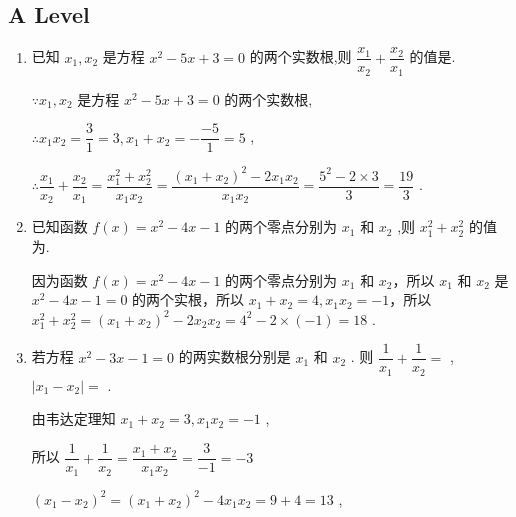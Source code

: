 \subsection*{A Level}
\begin{enumerate}
    \item 已知 ${x}_{1},{x}_{2}$ 是方程 ${x}^{2} - {5x} + 3 = 0$ 的两个实数根,则 $\dfrac{{x}_{1}}{{x}_{2}} + \dfrac{{x}_{2}}{{x}_{1}}$ 的值是.
    \begin{jieda}
        $\because {x}_{1},{x}_{2}$ 是方程 ${x}^{2} - {5x} + 3 = 0$ 的两个实数根,
        
        $\therefore {x}_{1}{x}_{2} = \dfrac{3}{1} = 3,{x}_{1} + {x}_{2} =  - \dfrac{-5}{1} = 5$ ,
        
        $\therefore \dfrac{{x}_{1}}{{x}_{2}} + \dfrac{{x}_{2}}{{x}_{1}} = \dfrac{{x}_{1}^{2} + {x}_{2}^{2}}{{x}_{1}{x}_{2}} = \dfrac{{\left( {x}_{1} + {x}_{2}\right) }^{2} - 2{x}_{1}{x}_{2}}{{x}_{1}{x}_{2}} = \dfrac{{5}^{2} - 2 \times  3}{3} = \dfrac{19}{3}$ .
        
    \end{jieda}
    
    \item 已知函数 $f\left( x\right)  = {x}^{2} - {4x} - 1$ 的两个零点分别为 ${x}_{1}$ 和 ${x}_{2}$ ,则 ${x}_{1}^{2} + {x}_{2}^{2}$ 的值为.
    \begin{jieda}
        因为函数 $f\left( x\right)  = {x}^{2} - {4x} - 1$ 的两个零点分别为 ${x}_{1}$ 和 ${x}_{2}$，所以 ${x}_{1}$ 和 ${x}_{2}$ 是 ${x}^{2} - {4x} - 1 = 0$ 的两个实根，所以 ${x}_{1} + {x}_{2} = 4,{x}_{1}{x}_{2} =  - 1$，所以 ${x}_{1}^{2} + {x}_{2}^{2} = {\left( {x}_{1} + {x}_{2}\right) }^{2} - 2{x}_{2}{x}_{2} = {4}^{2} - 2 \times  \left( {-1}\right)  = {18}$ .
    \end{jieda}
    \item 若方程 ${x}^{2} - {3x} - 1 = 0$ 的两实数根分别是 ${x}_{1}$ 和 ${x}_{2}$ . 则 $\dfrac{1}{{x}_{1}} + \dfrac{1}{{x}_{2}} =$ , $\left| {{x}_{1} - {x}_{2}}\right|  =$ .
    \begin{jieda}
        由韦达定理知 ${x}_{1} + {x}_{2} = 3,{x}_{1}{x}_{2} =  - 1$ ,
        
        所以 $\dfrac{1}{{x}_{1}} + \dfrac{1}{{x}_{2}} = \dfrac{{x}_{1} + {x}_{2}}{{x}_{1}{x}_{2}} = \dfrac{3}{-1} =  - 3$
        
        ${\left( {x}_{1} - {x}_{2}\right) }^{2} = {\left( {x}_{1} + {x}_{2}\right) }^{2} - 4{x}_{1}{x}_{2} = 9 + 4 = {13}$ ,
        

\end{jieda}
\end{enumerate}
